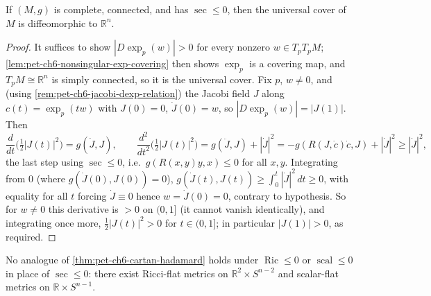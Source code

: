 \begin{theorem}
  \label{thm:pet-ch6-cartan-hadamard}
  If $(M,g)$ is complete, connected, and has $\sec\le0$, then the universal
  cover of $M$ is diffeomorphic to $\mathbb{R}^n$.
\end{theorem}
\begin{proof}
  It suffices to show $|D\exp_p(w)|>0$ for every nonzero $w\in T_pT_pM$;
  \cref{lem:pet-ch6-nonsingular-exp-covering} then shows $\exp_p$ is a
  covering map, and $T_pM\cong\mathbb{R}^n$ is simply connected, so it is the
  universal cover. Fix $p$, $w\ne0$, and (using
  \cref{rem:pet-ch6-jacobi-dexp-relation}) the Jacobi field $J$ along
  $c(t)=\exp_p(tw)$ with $J(0)=0$, $\dot J(0)=w$, so $|D\exp_p(w)|=|J(1)|$.
  Then
  \[
    \frac{d}{dt}\Big(\tfrac12|J(t)|^2\Big)=g(\dot J,J),\qquad
    \frac{d^2}{dt^2}\Big(\tfrac12|J(t)|^2\Big)
    =g(\ddot J,J)+|\dot J|^2=-g(R(J,\dot c)\dot c,J)+|\dot J|^2\ge|\dot J|^2,
  \]
  the last step using $\sec\le0$, i.e.\ $g(R(x,y)y,x)\le0$ for all $x,y$.
  Integrating from $0$ (where $g(\dot J(0),J(0))=0$),
  $g(\dot J(t),J(t))\ge\int_0^t|\dot J|^2\,dt\ge0$, with equality for all $t$
  forcing $\dot J\equiv0$ hence $w=\dot J(0)=0$, contrary to hypothesis. So for
  $w\ne0$ this derivative is $>0$ on $(0,1]$ (it cannot vanish identically),
  and integrating once more, $\tfrac12|J(t)|^2>0$ for $t\in(0,1]$; in
  particular $|J(1)|>0$, as required.
\end{proof}

\begin{remark}
  \label{rem:pet-ch6-cartan-hadamard-fails-ricci}
  No analogue of \cref{thm:pet-ch6-cartan-hadamard} holds under $\operatorname{Ric}\le0$
  or $\operatorname{scal}\le0$ in place of $\sec\le0$: there exist Ricci-flat metrics on
  $\mathbb{R}^2\times S^{n-2}$ and scalar-flat metrics on $\mathbb{R}\times S^{n-1}$.
\end{remark}

